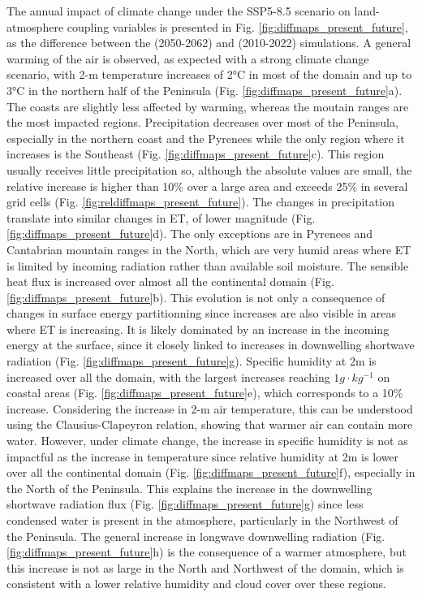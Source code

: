 The annual impact of climate change under the SSP5-8.5 scenario on land-atmosphere coupling variables is presented in Fig. \ref{fig:diffmaps_present_future}, as the difference between the \futnoirr (2050-2062) and \presnoirr (2010-2022) simulations. 
A general warming of the air is observed, as expected with a strong climate change scenario, with 2-m temperature increases of 2°C in most of the domain and up to 3°C in the northern half of the Peninsula (Fig. \ref{fig:diffmaps_present_future}a). The coasts are slightly less affected by warming, whereas the moutain ranges are the most impacted regions.
Precipitation decreases over most of the Peninsula, especially in the northern coast and the Pyrenees while the only region where it increases is the Southeast (Fig. \ref{fig:diffmaps_present_future}c). This region usually receives little precipitation so, although the absolute values are small, the relative increase is higher than 10\% over a large area and exceeds 25\% in several grid cells (Fig. \ref{fig:reldiffmaps_present_future}).
The changes in precipitation translate into similar changes in ET, of lower magnitude (Fig. \ref{fig:diffmaps_present_future}d). The only exceptions are in  Pyrenees and Cantabrian mountain ranges in the North, which are very humid areas where ET is limited by incoming radiation rather than available soil moisture.
The sensible heat flux is increased over almost all the continental domain  (Fig. \ref{fig:diffmaps_present_future}b). This evolution is not only a consequence of changes in surface energy partitionning since increases are also visible in areas where ET is increasing. It is likely dominated by an increase in the incoming energy at the surface, since it closely linked to increases in downwelling shortwave radiation (Fig. \ref{fig:diffmaps_present_future}g).
Specific humidity at 2m is increased over all the domain, with the largest increases reaching $1 g \cdot kg^{-1}$ on coastal areas (Fig. \ref{fig:diffmaps_present_future}e), which corresponds to a 10\% increase. Considering the increase in 2-m air temperature, this can be understood using the Clausius-Clapeyron relation, showing that warmer air can contain more water. %
However, under climate change, the increase in specific humidity is not as impactful as the increase in temperature since relative humidity at 2m is lower over all the continental domain (Fig. \ref{fig:diffmaps_present_future}f), especially in the North of the Peninsula. 
This explains the increase in the downwelling shortwave radiation flux (Fig. \ref{fig:diffmaps_present_future}g) since less condensed water is present in the atmosphere, particularly in the Northwest of the Peninsula. 
The general increase in longwave downwelling radiation (Fig. \ref{fig:diffmaps_present_future}h) is the consequence of a warmer atmosphere, but this increase is not as large in the North and Northwest of the domain, which is consistent with a lower relative humidity and cloud cover over these regions. 

